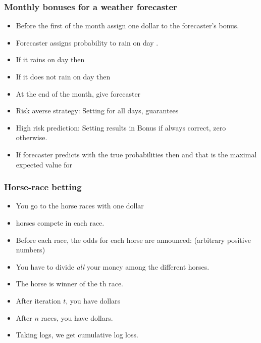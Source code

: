 \documentclass[handout]{beamer}
\begin{document}
\begin{frame}
\frametitle{Monthly bonuses for a weather forecaster}
\begin{itemize}
\item Before the first of the month assign one dollar to the forecaster's bonus. 
\item Forecaster assigns probability  to rain on day .
\item If it rains on day  then 
\item If it does not rain on day  then 
\item At the end of the month, give forecaster 
\item Risk averse strategy: Setting  for all days, guarantees 
\item High risk prediction: Setting  results in Bonus  if always correct, zero otherwise.
\item If forecaster predicts with the true probabilities then 
 and that is the maximal expected value for 
\end{itemize}
\end{frame}

\begin{frame}
\frametitle{Horse-race betting}
\begin{itemize}
\item You go to the horse races with one dollar 
\item {} horses compete in each race.
\item Before each race, the odds for each horse are announced:
   (arbitrary positive numbers)
\item You have to divide {\em all} your money among the different
  horses. 
\item The horse   is winner of the th race.
\item After iteration $t$, you have
   dollars
\item After $n$ races, you have
   dollars.
\item Taking logs, we get cumulative log loss.
\end{itemize}
\end{frame}
\end{document}
